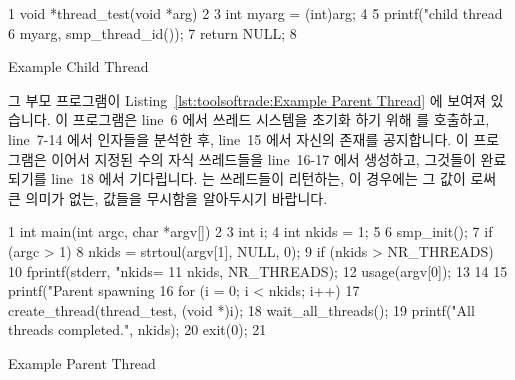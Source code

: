 \begin{listing}[tbp]
{ \scriptsize
\begin{verbbox}
  1 void *thread_test(void *arg)
  2 {
  3   int myarg = (int)arg;
  4
  5   printf("child thread %
  6          myarg, smp_thread_id());
  7   return NULL;
  8 }
\end{verbbox}
}
\centering
\theverbbox
\caption{Example Child Thread}
\label{lst:toolsoftrade:Example Child Thread}
\end{listing}

그 부모 프로그램이
Listing~\ref{lst:toolsoftrade:Example Parent Thread}
에 보여져 있습니다.
이 프로그램은 line~6 에서 쓰레드 시스템을 초기화 하기 위해  를
호출하고, line~7-14 에서 인자들을 분석한 후, line~15 에서 자신의 존재를
공지합니다.
이 프로그램은 이어서 지정된 수의 자식 쓰레드들을 line~16-17 에서 생성하고,
그것들이 완료되기를 line~18 에서 기다립니다.
 는 쓰레드들이 리턴하는, 이 경우에는 그 값이 
로써 큰 의미가 없는, 값들을 무시함을 알아두시기 바랍니다.

\begin{listing}[tbp]
{ \scriptsize
\begin{verbbox}
  1 int main(int argc, char *argv[])
  2 {
  3   int i;
  4   int nkids = 1;
  5
  6   smp_init();
  7   if (argc > 1) {
  8     nkids = strtoul(argv[1], NULL, 0);
  9     if (nkids > NR_THREADS) {
 10       fprintf(stderr, "nkids=%
 11         nkids, NR_THREADS);
 12       usage(argv[0]);
 13     }
 14   }
 15   printf("Parent spawning %
 16   for (i = 0; i < nkids; i++)
 17     create_thread(thread_test, (void *)i);
 18   wait_all_threads();
 19   printf("All threads completed.\n", nkids);
 20   exit(0);
 21 }
\end{verbbox}
}
\centering
\theverbbox
\caption{Example Parent Thread}
\label{lst:toolsoftrade:Example Parent Thread}
\end{listing}


